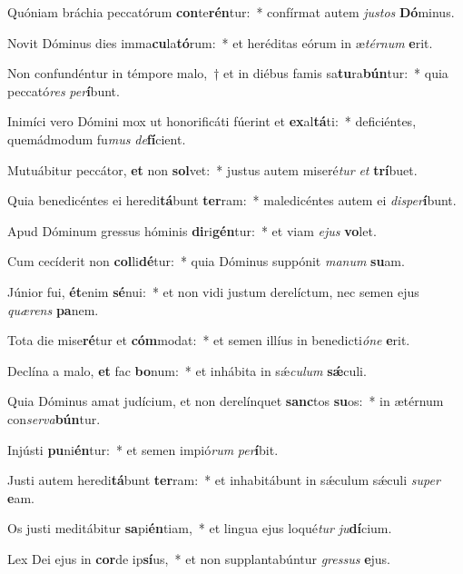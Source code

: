 \item Quóniam bráchia peccatórum \textbf{con}te\textbf{rén}tur:~* confírmat autem \textit{jus}\textit{tos} \textbf{Dó}minus.
\item Novit Dóminus dies imma\textbf{cu}la\textbf{tó}rum:~* et heréditas eórum in æ\textit{tér}\textit{num} \textbf{e}rit.
\item Non confundéntur in témpore malo,~† et in diébus famis sa\textbf{tu}ra\textbf{bún}tur:~* quia peccató\textit{res} \textit{per}\textbf{í}bunt.
\item Inimíci vero Dómini mox ut honorificáti fúerint et \textbf{ex}al\textbf{tá}ti:~* deficiéntes, quemádmodum fu\textit{mus} \textit{de}\textbf{fí}cient.
\item Mutuábitur peccátor, \textbf{et} non \textbf{sol}vet:~* justus autem miseré\textit{tur} \textit{et} \textbf{trí}buet.
\item Quia benedicéntes ei heredi\textbf{tá}bunt \textbf{ter}ram:~* maledicéntes autem ei \textit{dis}\textit{per}\textbf{í}bunt.
\item Apud Dóminum gressus hóminis \textbf{di}ri\textbf{gén}tur:~* et viam \textit{e}\textit{jus} \textbf{vo}let.
\item Cum cecíderit non \textbf{col}li\textbf{dé}tur:~* quia Dóminus suppónit \textit{ma}\textit{num} \textbf{su}am.
\item Júnior fui, \textbf{ét}enim \textbf{sé}nui:~* et non vidi justum derelíctum, nec semen ejus \textit{quæ}\textit{rens} \textbf{pa}nem.
\item Tota die mise\textbf{ré}tur et \textbf{cóm}modat:~* et semen illíus in benedicti\textit{ó}\textit{ne} \textbf{e}rit.
\item Declína a malo, \textbf{et} fac \textbf{bo}num:~* et inhábita in sǽ\textit{cu}\textit{lum} \textbf{sǽ}culi.
\item Quia Dóminus amat judícium, et non derelínquet \textbf{sanc}tos \textbf{su}os:~* in ætérnum con\textit{ser}\textit{va}\textbf{bún}tur.
\item Injústi \textbf{pu}ni\textbf{én}tur:~* et semen impió\textit{rum} \textit{per}\textbf{í}bit.
\item Justi autem heredi\textbf{tá}bunt \textbf{ter}ram:~* et inhabitábunt in sǽculum sǽculi \textit{su}\textit{per} \textbf{e}am.
\item Os justi meditábitur \textbf{sa}pi\textbf{én}tiam,~* et lingua ejus loqué\textit{tur} \textit{ju}\textbf{dí}cium.
\item Lex Dei ejus in \textbf{cor}de ip\textbf{sí}us,~* et non supplantabúntur \textit{gres}\textit{sus} \textbf{e}jus.
